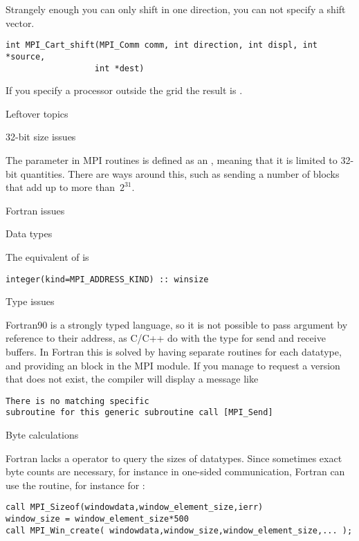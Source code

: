 Strangely enough you can only shift in one direction, you can not
specify a shift vector.
\begin{verbatim}
int MPI_Cart_shift(MPI_Comm comm, int direction, int displ, int *source, 
                  int *dest)
\end{verbatim}
If you specify a processor outside the grid
the result is .

 {Leftover topics}

 {32-bit size issues}

The  parameter in MPI routines is defined as an ,
meaning that it is limited to 32-bit quantities.  There are ways
around this, such as sending a number of
 blocks that add up to more than~$2^{31}$.

 {Fortran issues}

 {Data types}

The equivalent of  is
\begin{verbatim}
integer(kind=MPI_ADDRESS_KIND) :: winsize
\end{verbatim}

 {Type issues}

Fortran90 is a strongly typed language, so it is not possible to pass
argument by reference to their address, as C/C++ do with the 
type for send and receive buffers. In Fortran this is solved by having
separate routines for each datatype, and providing an  block
in the MPI module. If you manage to request a version that does not exist,
the compiler will display a message like
\begin{verbatim}
There is no matching specific 
subroutine for this generic subroutine call [MPI_Send]
\end{verbatim}

 {Byte calculations}
\label{sec:f-sizeof}

Fortran lacks a  operator to query the sizes of datatypes.
Since sometimes exact byte counts are necessary,
for instance in one-sided communication,
Fortran can use the  routine,
for instance for :
\begin{verbatim}
call MPI_Sizeof(windowdata,window_element_size,ierr)
window_size = window_element_size*500
call MPI_Win_create( windowdata,window_size,window_element_size,... );
\end{verbatim}

